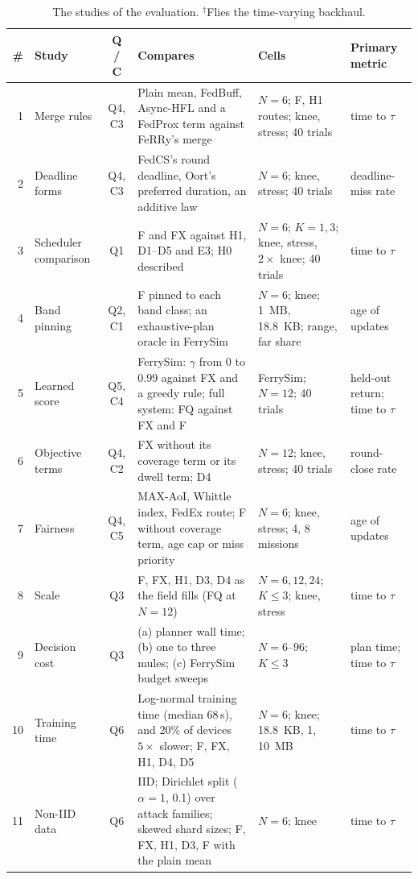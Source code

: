 \documentclass[conference]{IEEEtran}
\newcommand{\sysname}{FeRRy}
\begin{document}
\begin{table}[tp]
\centering
\caption{The studies of the evaluation. $^{\dagger}$Flies the time-varying
backhaul.}
\label{tab:studies}
\footnotesize
\begin{tabularx}{\textwidth}{@{}r l c L l l@{}}
\toprule
\textbf{\#} & \textbf{Study} & \textbf{Q / C} & \textbf{Compares} & \textbf{Cells} & \textbf{Primary metric} \\
 & Merge rules & Q4, C3 & Plain mean, FedBuff, Async-HFL and a FedProx term against \sysname{}'s merge & $N{=}6$; F, H1 routes; knee, stress; 40 trials & time to $\tau$ \\
2 & Deadline forms & Q4, C3 & FedCS's round deadline, Oort's preferred duration, an additive law & $N{=}6$; knee, stress; 40 trials & deadline-miss rate \\
3 & Scheduler comparison & Q1 & F and FX against H1, D1--D5 and E3; H0 described & $N{=}6$; $K{=}1,3$; knee, stress, $2\times$ knee; 40 trials & time to $\tau$ \\
4 & Band pinning & Q2, C1 & F pinned to each band class; an exhaustive-plan oracle in FerrySim & $N{=}6$; knee; 1~MB, 18.8~KB; range, far share & age of updates \\
5 & Learned score & Q5, C4 & FerrySim: $\gamma$ from 0 to 0.99 against FX and a greedy rule; full system: FQ against FX and F & FerrySim; $N{=}12$; 40 trials & held-out return; time to $\tau$ \\
6 & Objective terms & Q4, C2 & FX without its coverage term or its dwell term; D4 & $N{=}12$; knee, stress; 40 trials & round-close rate \\
7 & Fairness & Q4, C5 & MAX-AoI, Whittle index, FedEx route; F without coverage term, age cap or miss priority & $N{=}6$; knee, stress; 4, 8 missions & age of updates \\
8 & Scale & Q3 & F, FX, H1, D3, D4 as the field fills (FQ at $N{=}12$) & $N{=}6,12,24$; $K{\le}3$; knee, stress & time to $\tau$ \\
9 & Decision cost & Q3 & (a) planner wall time; (b) one to three mules; (c) FerrySim budget sweeps & $N{=}6$--$96$; $K{\le}3$ & plan time; time to $\tau$ \\
10 & Training time & Q6 & Log-normal training time (median 68\,s), and 20\% of devices $5\times$ slower; F, FX, H1, D4, D5 & $N{=}6$; knee; 18.8~KB, 1, 10~MB & time to $\tau$ \\
11 & Non-IID data & Q6 & IID; Dirichlet split ($\alpha{=}1$, 0.1) over attack families; skewed shard sizes; F, FX, H1, D3, F with the plain mean & $N{=}6$; knee & time to $\tau$ \\

\end{tabularx}
\end{table}
\end{document}
